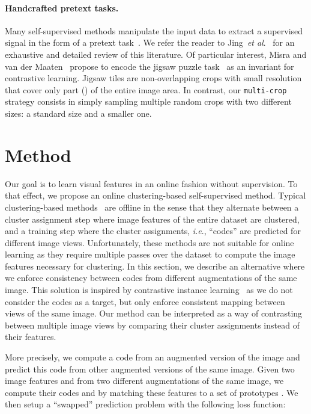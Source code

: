 \documentclass{article}
\def\onedot{.}
\def\ie{\emph{i.e}\onedot} \def\Ie{\emph{I.e}\onedot}
\def\etal{\emph{et al}\onedot}
\begin{document}
\paragraph{Handcrafted pretext tasks.}
Many self-supervised methods manipulate the input data to extract a supervised signal in the form of a pretext task~\cite{doersch2015unsupervised,agrawal2015learning,jenni2018self,kim2018learning,larsson2016learning,mahendran2018cross,misra2016shuffle,pathak2017learning,pathak2016context,wang2015unsupervised,wang2017transitive,zhang2017split}.
We refer the reader to Jing~\etal~\cite{jing2019self} for an exhaustive and detailed review of this literature.
Of particular interest, Misra and van der Maaten~\cite{misra2019self} propose to encode the jigsaw puzzle task~\cite{noroozi2016unsupervised} as an invariant for contrastive learning.
Jigsaw tiles are non-overlapping crops with small resolution that cover only part () of the entire image area.
In contrast, our \texttt{multi-crop} strategy consists in simply sampling multiple random crops with two different sizes: a standard size and a smaller one.

 


\section{Method}

Our goal is to learn visual features in an online fashion without supervision.
To that effect, we propose an online clustering-based self-supervised method.
Typical clustering-based methods~\cite{asano2019self,caron2018deep} are offline in the sense that they alternate between a cluster assignment step where image features of the entire dataset are clustered, and a training step where the cluster assignments, \ie, ``codes'' are predicted for different image views.
Unfortunately, these methods are not suitable for online learning as they require multiple passes over the dataset to compute the image features necessary for clustering.
In this section, we describe an alternative where we enforce consistency between codes from different augmentations of the same image.
This solution is inspired by contrastive instance learning~\cite{wu2018unsupervised} as we do not consider the codes as a target, but only enforce consistent mapping between views of the same image.
Our method can be interpreted as a way of contrasting between multiple image views by comparing their cluster assignments instead of their features.

More precisely, we compute a code from an augmented version of the image and predict this code from other augmented versions of the same image.
Given two image features  and  from two different augmentations of the same image, we compute their codes  and  by matching these features to a set of  prototypes .
We then setup a ``swapped'' prediction problem with the following loss function:
\end{document}
